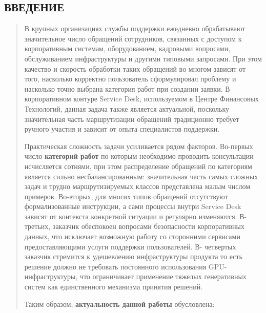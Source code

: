 \documentclass[
]{article}
\begin{document}
\hypertarget{section}{%
\subsection*{}\label{section}}

\hypertarget{ux432ux432ux435ux434ux435ux43dux438ux435}{%
\subsection*{ВВЕДЕНИЕ}\label{ux432ux432ux435ux434ux435ux43dux438ux435}}

\begin{quote}
В крупных организациях службы поддержки ежедневно обрабатывают
значительное число обращений сотрудников, связанных с доступом к
корпоративным системам, оборудованием, кадровыми вопросами,
обслуживанием инфраструктуры и другими типовыми запросами. При этом
качество и скорость обработки таких обращений во многом зависят от того,
насколько корректно пользователь сформулировал проблему и насколько
точно выбрана категория работ при создании заявки. В корпоративном
контуре Service Desk, используемом в Центре Финансовых Технологий,
данная задача также является актуальной, поскольку значительная часть
маршрутизации обращений традиционно требует ручного участия и зависит от
опыта специалистов поддержки.

Практическая сложность задачи усиливается рядом факторов. Во-первых
число \textbf{категорий работ} по которым необходимо проводить
консультации исчисляется сотнями, при этом распределение обращений по
категориям является сильно несбалансированным: значительная часть самых
сложных задач и трудно маршрутизируемых классов представлена малым
числом примеров. Во-вторых, для многих типов обращений отсутствуют
формализованные инструкции, а сами процессы внутри Service Desk зависят
от контекста конкретной ситуации и регулярно изменяются. В-третьих,
заказчик обеспокоен вопросами безопасности корпоративных данных, что
исключает возможную работу со сторонними сервисами предоставляющими
услуги поддержки пользователей. В- четвертых заказчик стремится к
удешевлению инфраструктуры продукта то есть решение должно не требовать
постоянного использования GPU-инфраструктуры, что ограничивает
применение тяжелых генеративных систем как единственного механизма
принятия решений.

Таким образом, \textbf{актуальность данной работы} обусловлена:
\end{quote}
\end{document}
